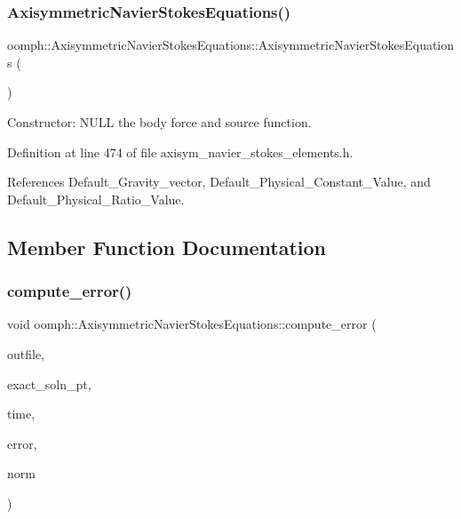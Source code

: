 \subsubsection{\texorpdfstring{Axisymmetric\+Navier\+Stokes\+Equations()}{AxisymmetricNavierStokesEquations()}}
{\footnotesize\ttfamily oomph\+::\+Axisymmetric\+Navier\+Stokes\+Equations\+::\+Axisymmetric\+Navier\+Stokes\+Equations (\begin{DoxyParamCaption}{ }\end{DoxyParamCaption})\hspace{0.3cm}{\ttfamily [inline]}}



Constructor\+: N\+U\+LL the body force and source function. 



Definition at line 474 of file axisym\+\_\+navier\+\_\+stokes\+\_\+elements.\+h.



References Default\+\_\+\+Gravity\+\_\+vector, Default\+\_\+\+Physical\+\_\+\+Constant\+\_\+\+Value, and Default\+\_\+\+Physical\+\_\+\+Ratio\+\_\+\+Value.



\subsection{Member Function Documentation}
\mbox{\label{classoomph_1_1AxisymmetricNavierStokesEquations_a827372afbe927e224d3648b7d6477f2d}} 
\subsubsection{\texorpdfstring{compute\+\_\+error()}{compute\_error()}\hspace{0.1cm}{\footnotesize\ttfamily [1/2]}}
{\footnotesize\ttfamily void oomph\+::\+Axisymmetric\+Navier\+Stokes\+Equations\+::compute\+\_\+error (\begin{DoxyParamCaption}\item[{std\+::ostream \&}]{outfile,  }\item[{\hyperlink{classoomph_1_1FiniteElement_ad4ecf2b61b158a4b4d351a60d23c633e}{Finite\+Element\+::\+Unsteady\+Exact\+Solution\+Fct\+Pt}}]{exact\+\_\+soln\+\_\+pt,  }\item[{const double \&}]{time,  }\item[{double \&}]{error,  }\item[{double \&}]{norm }\end{DoxyParamCaption})\hspace{0.3cm}{\ttfamily [virtual]}}



